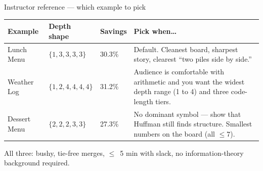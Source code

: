 \documentclass[aspectratio=169, 12pt, xcolor={dvipsnames,table}]{beamer}
\newcommand{\hintline}[1]{\vfill\begin{center}\small\textcolor{hint}{#1}\end{center}}
\begin{document}
\begin{frame}{Instructor reference --- which example to pick}
\small
\renewcommand{\arraystretch}{1.4}
\begin{tabular}{l p{2.3cm} p{2.0cm} p{4.7cm}}
\toprule
Example & Depth shape & Savings & Pick when\ldots \\
\midrule
Lunch Menu    & $\{1,3,3,3,3\}$   & 30.3\% & Default. Cleanest board, sharpest story, clearest ``two piles side by side.'' \\
Weather Log   & $\{1,2,4,4,4,4\}$ & 31.2\% & Audience is comfortable with arithmetic and you want the widest depth range (1 to 4) and three code-length tiers. \\
Dessert Menu  & $\{2,2,2,3,3\}$   & 27.3\% & No dominant symbol --- show that Huffman still finds structure. Smallest numbers on the board (all $\le 7$). \\
\bottomrule
\end{tabular}
\vfill
\hintline{All three: bushy, tie-free merges, $\le$~5 min with slack, no information-theory background required.}
\end{frame}
\end{document}
